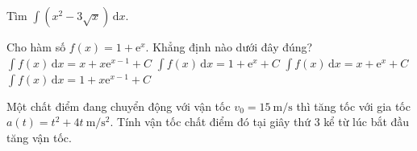 \begin{bt}%
	 Tìm $\displaystyle\int\left( x^2-3\sqrt{x}\right) \mathrm{\,d}x$.
\end{bt}

\begin{ex}%
	Cho  hàm số $f(x)=1+\mathrm{e}^x$. Khẳng định nào dưới đây đúng?
	 \choice
		 {$\displaystyle\int f(x)\mathrm{\,d}x=x+x \mathrm{e}^{x-1}+C$}
		{$\displaystyle\int f(x)\mathrm{\,d}x=1+\mathrm{e}^x+C$} 
		{\True $\displaystyle\int f(x)\mathrm{\,d}x=x+\mathrm{e}^x+C$} 
		{$\displaystyle\int  f(x)\mathrm{\,d}x=1+x \mathrm{e}^{x-1}+C$}
\end{ex}

\begin{bt}%
	Một chất điểm đang chuyển động với vận tốc  $v_0=15~\mathrm{m/s}$ thì tăng tốc với gia tốc $a(t)=t^2+4t~\mathrm{m/s^2}$. Tính vận tốc chất điểm đó tại giây thứ $3$ kể từ lúc bắt đầu tăng vận tốc.
\end{bt}

